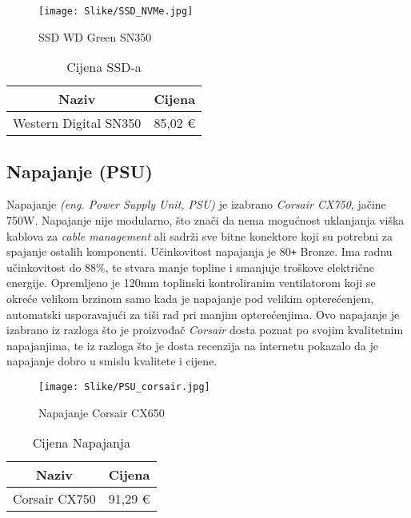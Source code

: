 \documentclass{article}
\begin{document}
    \begin{figure}[H]
        \centering
        \texttt{[image: Slike/SSD\_NVMe.jpg]}
        \caption{SSD WD Green SN350}
        \label{fig:Pohrana}
    \end{figure}

    \begin{table}[H]
        \centering
        \begin{tabular}{|c|c|}
            \hline
            Naziv & Cijena \\
            \hline
            Western Digital SN350 & 85,02 € \\
            \hline
        \end{tabular}
        \caption{Cijena SSD-a}
        \label{tab:Pohrana}
    \end{table}

    \clearpage
    \subsection{Napajanje (PSU)}
    Napajanje \emph{(eng. Power Supply Unit, PSU)} je izabrano \textit{Corsair CX750}, jačine 750W. Napajanje nije modularno, što znači da nema mogućnost uklanjanja viška kablova za \textit{cable management} ali sadrži sve bitne konektore koji su potrebni za spajanje ostalih komponenti. Učinkovitost napajanja je 80\texttt{+} Bronze. Ima radnu učinkovitost do 88\%, te stvara manje topline i smanjuje troškove električne energije. Opremljeno je 120mm toplinski kontroliranim ventilatorom koji se okreće velikom brzinom samo kada je napajanje pod velikim opterećenjem, automatski usporavajući za tiši rad pri manjim opterećenjima. Ovo napajanje je izabrano iz razloga što je proizvođač \textit{Corsair} dosta poznat po svojim kvalitetnim napajanjima, te iz razloga što je dosta recenzija na internetu pokazalo da je napajanje dobro u smislu kvalitete i cijene.

    \begin{figure}[H]
        \centering
        \texttt{[image: Slike/PSU\_corsair.jpg]}
        \caption{Napajanje Corsair CX650}
        \label{fig:Napajanje}
    \end{figure}

    \begin{table}[H]
        \centering
        \begin{tabular}{|c|c|}
            \hline
            Naziv & Cijena \\
            \hline
            Corsair CX750 & 91,29 € \\
            \hline
        \end{tabular}
        \caption{Cijena Napajanja}
        \label{tab:Napajanje}
    \end{table}
\end{document}
